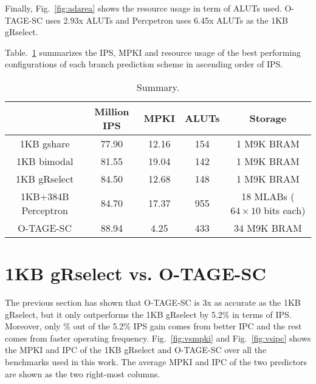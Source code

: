 Finally, Fig.~\ref{fig:adarea} shows the resource usage in term of ALUTs used. \mbox{O-TAGE-SC} uses 2.93x ALUTs and Percpetron uses 6.45x ALUTs as the 1KB gRselect.

Table.~\ref{tab:summary} summarizes the IPS, MPKI and resource usage of the best performing configurations of each branch prediction scheme in ascending order of IPS.

\begin{table}[h]
\begin{center}
\def\arraystretch{1.2}
\begin{tabular}{|c|c|c|c|c|}
\hline
 & \textbf{Million IPS} & \textbf{MPKI} & \textbf{ALUTs} & \textbf{Storage} \\ \hline
1KB gshare			& 77.90	& 12.16	& 154 & 1 M9K BRAM \\ \hline
1KB bimodal			& 81.55	& 19.04	& 142 & 1 M9K BRAM \\ \hline
1KB gRselect		& 84.50	& 12.68	& 148 & 1 M9K BRAM \\ \hline
1KB+384B Perceptron	& 84.70	& 17.37	& 955 & 18 MLABs ($64 \times 10$ bits each) \\ \hline
O-TAGE-SC			& 88.94	& 4.25	& 433 & 34 M9K BRAM \\ \hline
\end{tabular}
\caption{Summary.\label{tab:summary}}
\end{center}
\end{table}


\section{1KB gRselect vs. O-TAGE-SC}
\label{sec:eval:vs}
The previous section has shown that \mbox{O-TAGE-SC} is \mytilde 3x as accurate as the 1KB gRselect, but it only outperforms the 1KB gRselect by 5.2\% in terms of IPS. Moreover, only \% out of the 5.2\% IPS gain comes from better IPC and the rest comes from faster operating frequency. Fig.~\ref{fig:vsmpki} and Fig.~\ref{fig:vsipc} shows the MPKI and IPC of the 1KB gRselect and \mbox{O-TAGE-SC} over all the benchmarks used in this work. The average MPKI and IPC of the two predictors are shown as the two right-most columns.


